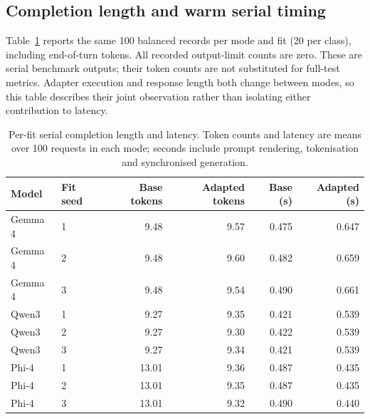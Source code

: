 \subsection{Completion length and warm serial timing}
\label{sec:serial_tokens}
Table~\ref{tab:serial_tokens} reports the same 100 balanced records
per mode and fit (20 per class), including end-of-turn tokens.
All recorded output-limit counts are zero. These are serial benchmark
outputs; their token counts are not substituted for full-test metrics.
Adapter execution and response length both change between modes,
so this table describes their joint observation rather than isolating
either contribution to latency.
\begin{table}[tb]\centering\small
\caption{Per-fit serial completion length and latency. Token counts and
latency are means over 100 requests in each mode; seconds include prompt
rendering, tokenisation and synchronised generation.}
\label{tab:serial_tokens}
\begin{tabular}{llrrrr}\toprule
Model & Fit seed & Base tokens & Adapted tokens & Base (s) & Adapted (s) \\\midrule
Gemma 4 & 1 & 9.48 & 9.57 & 0.475 & 0.647 \\
Gemma 4 & 2 & 9.48 & 9.60 & 0.482 & 0.659 \\
Gemma 4 & 3 & 9.48 & 9.54 & 0.490 & 0.661 \\
Qwen3 & 1 & 9.27 & 9.35 & 0.421 & 0.539 \\
Qwen3 & 2 & 9.27 & 9.30 & 0.422 & 0.539 \\
Qwen3 & 3 & 9.27 & 9.34 & 0.421 & 0.539 \\
Phi-4 & 1 & 13.01 & 9.36 & 0.487 & 0.435 \\
Phi-4 & 2 & 13.01 & 9.35 & 0.487 & 0.435 \\
Phi-4 & 3 & 13.01 & 9.32 & 0.490 & 0.440 \\
\bottomrule\end{tabular}\end{table}
